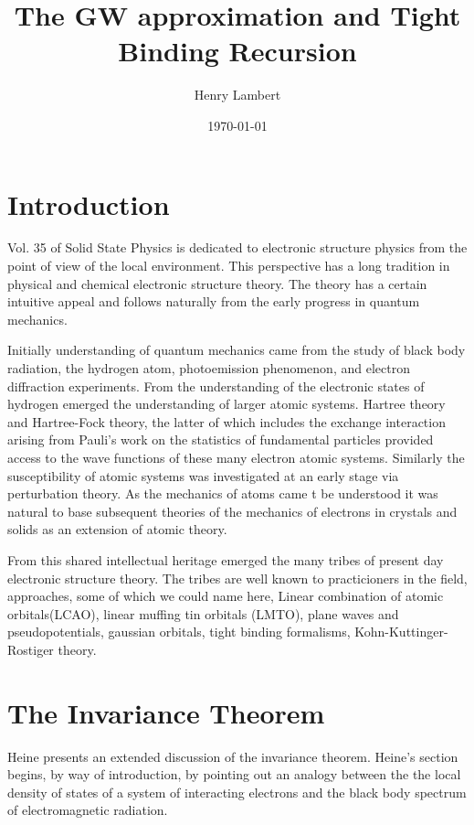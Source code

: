 \documentclass{article}
\begin{document}
\title{The GW approximation and Tight Binding Recursion}
\author{Henry Lambert}
\date{\today}
\maketitle

\section{Introduction}
  Vol. 35 of Solid State Physics is dedicated to electronic structure
physics from the point of view of the local environment. This perspective
has a long tradition in physical and chemical electronic structure theory.
The theory has a certain intuitive appeal and follows naturally from 
the early progress in quantum mechanics. 

Initially understanding of quantum mechanics came from the study
of black body radiation, the hydrogen atom, photoemission phenomenon, 
and electron diffraction experiments. From 
the understanding of the electronic states of hydrogen emerged the
understanding of larger atomic systems. Hartree theory and Hartree-Fock
theory, the latter of which includes the exchange interaction arising 
from Pauli's work on the statistics of fundamental particles 
provided access to the wave functions of these many electron 
atomic systems. Similarly the susceptibility of atomic
systems was investigated at an early stage via perturbation theory.
As the mechanics of atoms came t  be understood it was natural 
to base subsequent theories of the mechanics
of electrons in crystals and solids as an extension of atomic theory.

From this shared intellectual heritage emerged the many tribes of present
day electronic structure theory. The tribes are well known 
to practicioners in the field, approaches, some of which we could name 
here, Linear combination of atomic orbitals(LCAO), 
linear muffing tin orbitals (LMTO), plane waves
and pseudopotentials, gaussian orbitals, tight binding formalisms, 
Kohn-Kuttinger-Rostiger theory.

\section{The Invariance Theorem}
\label{sec:invariance}
Heine presents an extended discussion of the invariance
theorem. Heine's section begins, by way of introduction, by pointing 
out an analogy between  the the local density of states of a system of interacting
electrons and the black body spectrum of electromagnetic radiation.
\end{document}

